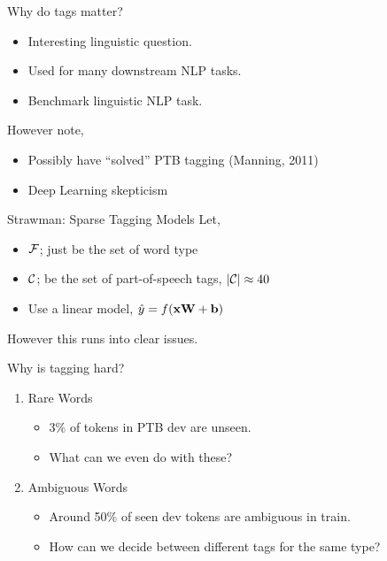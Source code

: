 \documentclass{beamer}
\begin{document}
\begin{frame}{Why do tags matter?}
  \begin{itemize}
    \item Interesting linguistic question.
      \air

    \item Used for many downstream NLP tasks.
    \air

    \item Benchmark linguistic NLP task.
  \end{itemize}
  \pause

  However note,

  \begin{itemize}
  \item Possibly have ``solved'' PTB tagging (Manning, 2011)
    \air

  \item Deep Learning skepticism
  \end{itemize}
\end{frame}

\begin{frame}{Strawman: Sparse Tagging Models}
  Let,
  \begin{itemize}
  \item $\mathcal{F}$; just be the set of word type
    \air
  \item $\mathcal{C}$; be the set of part-of-speech tags, $|\mathcal{C}|\approx 40$
    \air
  \item Use a linear model, $\hat{y} = f(\mathbf{x} \mathbf{W} + \mathbf{b})$
  \end{itemize}
  However this runs into clear issues.

\end{frame}


\begin{frame}{Why is tagging hard?}
  \begin{enumerate}
  \item
  Rare Words
  \begin{itemize}
  \item 3\% of tokens in PTB dev are unseen.
  \item What can we even do with these?
  \end{itemize}

  \item Ambiguous Words
  \begin{itemize}
  \item Around 50\% of seen dev tokens are ambiguous in train.
  \item How can we decide between different tags for the same type?
  \end{itemize}
  \end{enumerate}
\end{frame}
\end{document}
